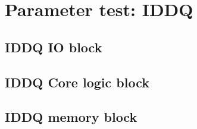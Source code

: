 
\chapter{Parameter test: IDDQ}


 
\newpage 
\section{IDDQ IO block}


\newpage


\newpage



\newpage
\section{IDDQ Core logic block}


\newpage


\newpage


\newpage



\newpage
\section{IDDQ memory block}


\newpage


\newpage


\newpage


\newpage


\newpage


\renewcommand{\VDIO}{5}


%
\newpage


\newpage




